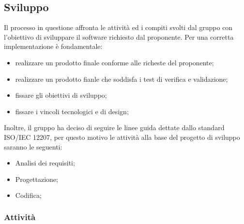 \subsection{Sviluppo}
Il processo in questione affronta le attività ed i compiti svolti dal gruppo con l'obiettivo di sviluppare il software richiesto dal proponente. Per una corretta implementazione è fondamentale:
\begin{itemize}
		\item realizzare un prodotto finale conforme alle richeste del proponente; 	
		\item realizzare un prodotto fianle che soddisfa i test di verifica e validazione; 	
		\item fissare gli obiettivi di sviluppo; 	
		\item fissare i vincoli tecnologici e di design; 	
\end{itemize}
Inoltre, il gruppo ha deciso di seguire le linee guida dettate dallo standard ISO/IEC 12207, per questo motivo le attività alla base del progetto di sviluppo saranno le seguenti:
\begin{itemize}
	\item Analisi dei requisiti; 	
	\item Progettazione;	
	\item Codifica; 	
\end{itemize}
\subsubsection{Attività}
